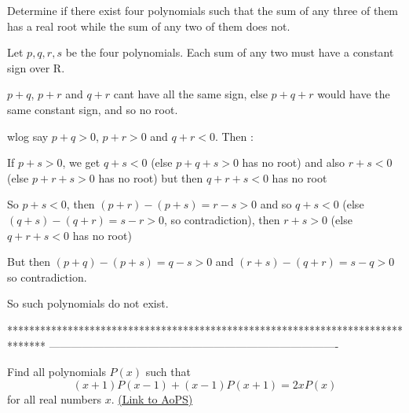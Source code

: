 \begin{solution}
	\begin{tcolorbox}Determine if there exist four polynomials such that the sum of any three of them has a real root while the sum of any two of them does not.\end{tcolorbox}

Let $ p,q,r,s$ be the four polynomials. Each sum of any two must have a constant sign over R.

$ p + q$, $ p + r$ and $ q + r$ cant have all the same sign, else $ p + q + r$ would have the same constant sign, and so no root.

wlog say $ p + q > 0$, $ p + r > 0$ and $ q + r < 0$. Then :

If $ p + s > 0$, we get $ q + s < 0$ (else $ p + q + s > 0$ has no root) and also $ r + s < 0$ (else $ p + r + s > 0$ has no root) but then $ q + r + s < 0$ has no root

So $ p + s < 0$, then $ (p + r) - (p + s) = r - s > 0$ and so $ q + s < 0$ (else $ (q + s) - (q + r) = s - r > 0$, so contradiction), then $ r + s > 0$ (else $ q + r + s < 0$ has no root)

But then $ (p + q) - (p + s) = q - s > 0$ and $ (r + s) - (q + r) = s - q > 0$ so contradiction.

So such polynomials do not exist.
\end{solution}
*******************************************************************************
-------------------------------------------------------------------------------

\begin{problem}
	Find all polynomials $P(x)$ such that
\[(x +1)P(x-1)+(x-1)P(x+1)=2xP(x)\]
for all real numbers $x$.
	\flushright \href{https://artofproblemsolving.com/community/c6h314492}{(Link to AoPS)}
\end{problem}



